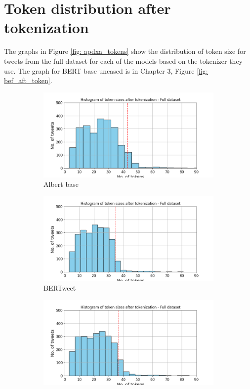 \section{Token distribution after tokenization}
\label{sec: apdxa_token_dist}
The graphs in Figure \ref{fig: apdxa_tokens} show the distribution of token size for tweets from the full dataset for each of the models based on the tokenizer they use. The graph for BERT base uncased is in Chapter 3, Figure \ref{fig: bef_aft_token}.
\begin{figure}[htbp]
    \centering
    \captionsetup{font=small}
    \begin{subfigure}[b]{0.48\textwidth}
        \includegraphics[width=\textwidth]{figures/token_pp_hist_albert-base-v2.png}
        \caption{Albert base}
        \label{fig: token_pp_hist_albert}
    \end{subfigure}
    \hfill
    \begin{subfigure}[b]{0.48\textwidth}
        \includegraphics[width=\textwidth]{figures/token_pp_hist_vinai-bertweet-base.png}
        \caption{BERTweet}
        \label{fig: token_pp_hist_bertwteet}
    \end{subfigure}
    \begin{subfigure}[b]{0.48\textwidth}
        \includegraphics[width=\textwidth]{figures/token_pp_hist_prajjwal1-bert-tiny.png}

\end{subfigure}
\end{figure}
